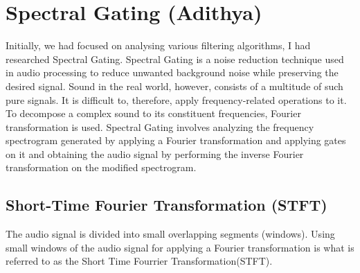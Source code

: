 \documentclass[conference]{IEEEtran}
\begin{document}







\section{Spectral Gating (Adithya)}
Initially, we had focused on analysing various filtering algorithms, I had researched Spectral Gating. Spectral
Gating is a noise reduction technique used in audio processing
to reduce unwanted background noise while preserving the
desired signal.
Sound in the real world, however, consists of a multitude of
such pure signals. It is difficult to, therefore, apply frequency-related operations to it. To decompose a complex sound to its
constituent frequencies, Fourier transformation is used.
Spectral Gating involves analyzing the frequency spectrogram generated by applying a Fourier transformation and
applying gates on it and obtaining the audio signal by performing the inverse Fourier transformation on the modified
spectrogram.

\subsection{Short-Time Fourier Transformation (STFT)}
The audio signal is divided into small overlapping segments
(windows). Using small windows of the audio signal for
applying a Fourier transformation is what is referred to as
the Short Time Fourrier Transformation(STFT).
\end{document}
